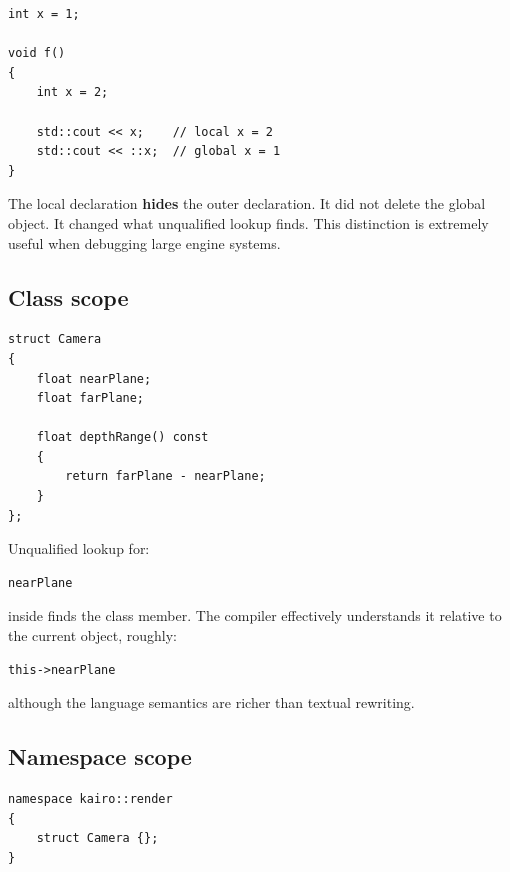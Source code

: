 \hypertarget{01-foundations-i-ch002-name-hiding}{}

\begin{verbatim}
int x = 1;

void f()
{
    int x = 2;

    std::cout << x;    // local x = 2
    std::cout << ::x;  // global x = 1
}
\end{verbatim}

The local declaration \textbf{hides} the outer declaration. It did not delete the global object. It changed what unqualified lookup finds. This distinction is extremely useful when debugging large engine systems.

\subsection{Class scope}\label{01-foundations-i-ch002-class-scope}

\hypertarget{01-foundations-i-ch002-class-scope}{}

\begin{verbatim}
struct Camera
{
    float nearPlane;
    float farPlane;

    float depthRange() const
    {
        return farPlane - nearPlane;
    }
};
\end{verbatim}

Unqualified lookup for:

\begin{verbatim}
nearPlane
\end{verbatim}

inside  finds the class member. The compiler effectively understands it relative to the current object, roughly:

\begin{verbatim}
this->nearPlane
\end{verbatim}

although the language semantics are richer than textual rewriting.

\subsection{Namespace scope}\label{01-foundations-i-ch002-namespace-scope}

\hypertarget{01-foundations-i-ch002-namespace-scope}{}

\begin{verbatim}
namespace kairo::render
{
    struct Camera {};
}
\end{verbatim}

